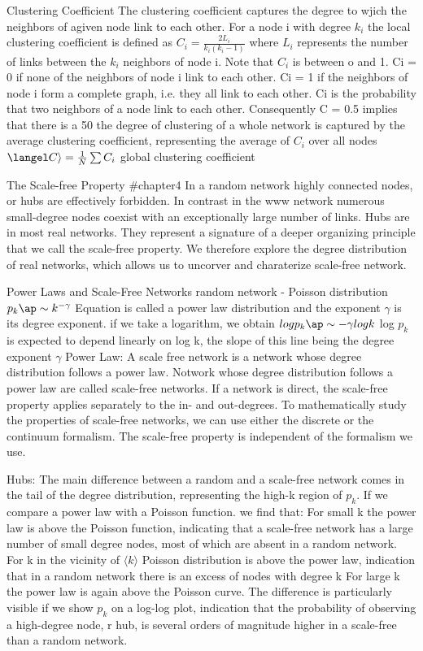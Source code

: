 Clustering Coefficient 
    The clustering coefficient captures the degree to wjich the neighbors of agiven node link to each other. For a node i with degree $k_{i}$ the local clustering coefficient is defined as
    $C_i= \frac{2L_{i}}{k_{i}(k_{i}-1)}$
    where $L_{i}$ represents the number of links between the $k_{i}$ neighbors of node i. Note that $C_{i}$ is between o and 1. 
        Ci = 0 if none of the neighbors of node i link to each other.
        Ci = 1 if the neighbors of node i form a complete graph, i.e. they all link to each other.
        Ci is the probability that two neighbors of a node link to each other. Consequently C = 0.5 implies that there is a 50%
    the degree of clustering of a whole network is captured by the average clustering coefficient, representing the average of $C_{i}$ over all nodes
        $\langel C \rangle = \frac{1}{N} \sum C_{i}$
global clustering coefficient 

The Scale-free Property #chapter4
In a random network highly connected nodes, or hubs are effectively forbidden. In contrast in the www network numerous small-degree nodes coexist with an exceptionally large number of links. Hubs are in most real networks. They represent a signature of a deeper organizing principle that we call the scale-free property. We therefore explore the degree distribution of real networks, which allows us to uncorver and charaterize scale-free network. 

Power Laws and Scale-Free Networks
    random network - Poisson distribution 
$p_{k} \ap \sim k^{-\gamma}$
    Equation is called a power law distribution and the exponent $\gamma$ is its degree exponent. if we take a logarithm, we obtain $log p_{k} \ap \sim {-\gamma}log k$
    log $p_{k}$ is expected to depend linearly on log k, the slope of this line being the degree exponent $\gamma$
Power Law:  
    A scale free network is a network whose degree distribution follows a power law.
    Notwork whose degree distribution follows a power law are called scale-free networks. If a network is direct, the scale-free property applies separately to the in- and out-degrees. To mathematically study the properties of scale-free networks, we can use either the discrete or the continuum formalism. The scale-free property is independent of the formalism we use. 
    
Hubs: 
    The main difference between a random and a scale-free network comes in the tail of the degree distribution, representing the high-k region of $p_k$. If we compare a power law with a Poisson function. we find that: 
        For small k the power law is above the Poisson function, indicating that a scale-free network has a large number of small degree nodes, most of which are absent in a random network. 
        For k in the vicinity of $\langle k \rangle $ Poisson distribution is above the power law, indication that in a random network there is an excess of nodes with degree k
        For large k the power law is again above the Poisson curve. The difference is particularly visible if we show $p_k$ on a log-log plot, indication that the probability of observing a high-degree node, r hub, is several orders of magnitude higher in a scale-free than a random network. 
        
